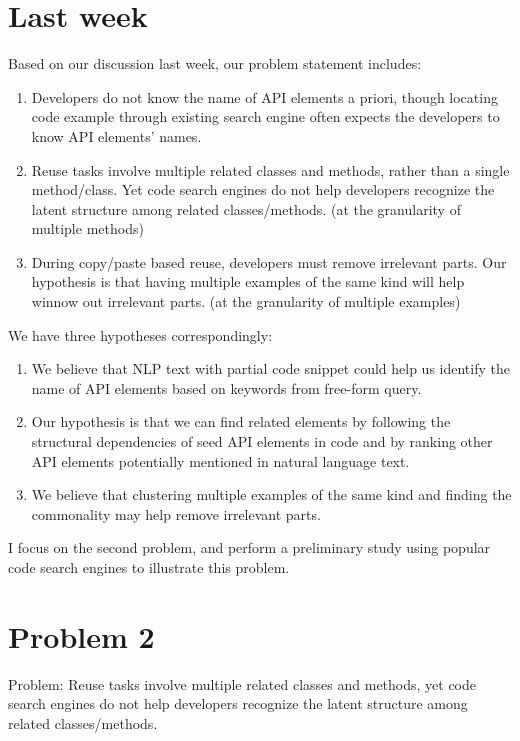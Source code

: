 
\section{Last week}

Based on our discussion last week, our problem statement includes:

\begin{enumerate}
\item Developers do not know the name of API elements a priori, though locating code example through existing search engine often expects the developers to know API elements' names.
\item Reuse tasks involve multiple related classes and methods, rather than a single method/class. Yet code search engines do not help developers recognize the latent structure among related classes/methods. (at the granularity of multiple methods)
\item During copy/paste based reuse, developers must remove irrelevant parts. Our hypothesis is that having multiple examples of the same kind will help winnow out irrelevant parts. (at the granularity of multiple examples)
\end{enumerate}

We have three hypotheses correspondingly:
\begin{enumerate}
\item We believe that NLP text with partial code snippet could help us identify the name of API elements based on keywords from free-form query. 

\item Our hypothesis is that we can find related elements by following the structural dependencies of seed API elements in code and by ranking other API elements potentially mentioned in natural language text. 

\item We believe that clustering multiple examples of the same kind and finding the commonality may help remove irrelevant parts. 

\end{enumerate}

I focus on the second  problem, and perform a preliminary study using popular code search engines to illustrate this problem. 



\section{Problem 2}
Problem: Reuse tasks involve multiple related classes and methods, yet code search engines do not help developers recognize the latent structure among related classes/methods.

